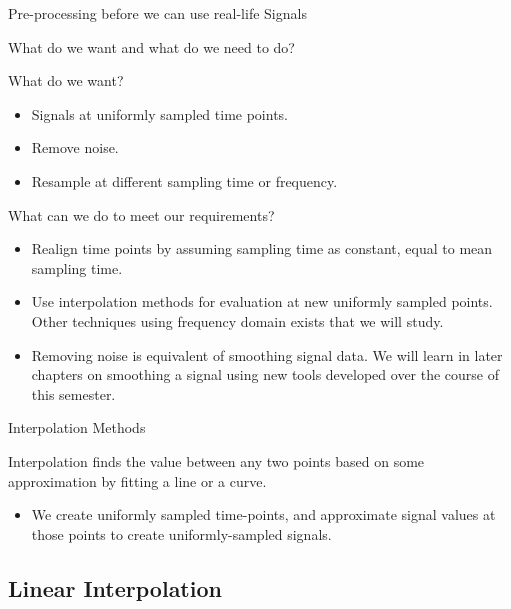 \documentclass[aspectratio=169,xcolor=dvipsnames,svgnames,x11names,fleqn]{beamer}
\begin{document}
\begin{frame}{Pre-processing before we can use real-life Signals}

What do we want and what do we need to do?

What do we want?
\begin{itemize}

\item Signals at uniformly sampled time points.
\item Remove noise.
\item Resample at different sampling time or frequency.
\end{itemize}

What can we do to meet our requirements?

\begin{itemize}
\item Realign time points by assuming sampling time as constant, equal to mean sampling time.

\item Use interpolation methods for evaluation at new uniformly sampled points. Other techniques using frequency domain exists that we will study.

\item Removing noise is equivalent of smoothing signal data. We will learn in later chapters on smoothing a signal using new tools developed over the course of this semester.

\end{itemize}


\end{frame}


\begin{frame}{Interpolation Methods}


\begin{talert}{}
Interpolation finds the value between any two points based on some approximation by fitting a line or a curve.
\end{talert}

\begin{itemize}
\item We create uniformly sampled time-points, and approximate signal values at those points to create uniformly-sampled signals.
\end{itemize}


\end{frame}


\subsection{Linear Interpolation}
\end{document}
